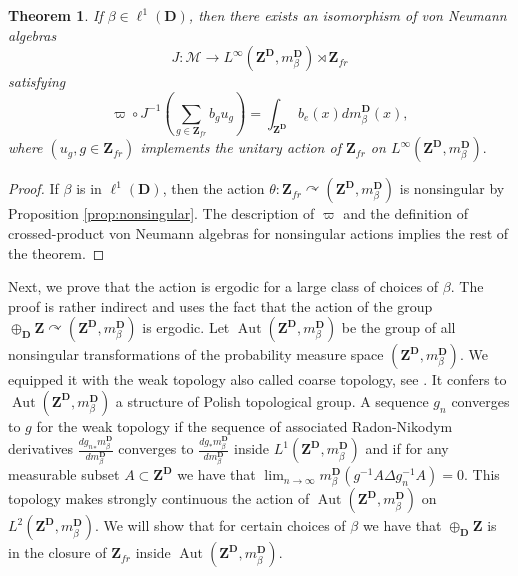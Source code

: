 \documentclass[a4paper,12pt]{amsart}
\numberwithin{equation}{section}
\newtheorem{theo}{Theorem}[section]
\theoremstyle{definition}
\newcommand{\act}{\curvearrowright}
\DeclareMathOperator{\Aut}{Aut}
\newcommand{\D}{\mathbf D}
\newcommand{\scrM}{\mathscr M}
\newcommand{\mbD}{m_\beta^\D}
\newcommand{\Z}{\mathbf{Z}}
\begin{document}
\begin{theo}
If $\beta\in\ell^{1}(\D)$, then there exists an isomorphism of von Neumann algebras 
$$J:\scrM\to L^\infty(\Z^\D, m^\D_\beta)\rtimes \Z_{fr}$$
satisfying
$$ \varpi \circ J^{-1}(\sum_{g\in\Z_{fr}} b_g u_g ) = \int_{ { \Z}^\D } b_e(x) d m_\beta^\D(x),$$
where $(u_g,g\in\Z_{fr})$ implements the unitary action of $\Z_{fr}$ on $L^\infty(\Z^\D,\mbD).$
\end{theo}
\begin{proof}
If $\beta$ is in $\ell^{1}(\D)$, then the action $\theta: \Z_{fr}\act (\Z^\D, \mbD)$ is nonsingular by Proposition \ref{prop:nonsingular}.
The description of $\varpi$ and the definition of crossed-product von Neumann algebras for nonsingular actions implies the rest of the theorem.
\end{proof}

Next, we prove that the action is ergodic for a large class of choices of $\beta.$
The proof is rather indirect and uses the fact that the action of the group $\oplus_\D \Z\act (\Z^\D,\mbD)$ is ergodic.
Let $\Aut(\Z^\D, \mbD)$ be the group of all nonsingular transformations of the probability measure space $(\Z^\D, \mbD).$
We equipped it with the weak topology also called coarse topology, see \cite{Choksi-Kakutani79}.
It confers to $\Aut(\Z^\D, \mbD)$ a structure of Polish topological group.
A sequence $g_n$ converges to $g$ for the weak topology if the sequence of associated Radon-Nikodym derivatives $\tfrac{d{g_n}_* \mbD}{ d \mbD}$ converges to $\tfrac{d{g}_* \mbD}{ d \mbD}$ inside $L^1(\Z^\D, \mbD)$ and if for any measurable subset $A\subset \Z^\D$ we have that $\lim_{n\to\infty}\mbD( g^{-1}A\Delta g_n^{-1} A)=0$.
This topology makes strongly continuous the action of $\Aut(\Z^\D, \mbD)$ on $L^2(\Z^\D, \mbD)$.
We will show that for certain choices of $\beta$ we have that $\oplus_\D\Z$ is in the closure of $\Z_{fr}$ inside $\Aut(\Z^\D, \mbD)$.
\end{document}
